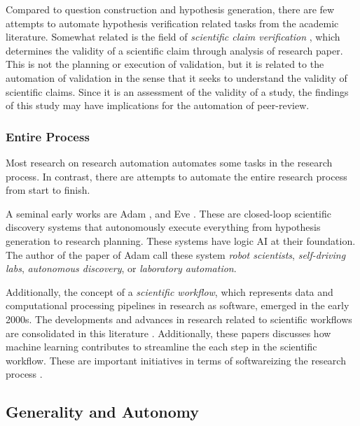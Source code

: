 Compared to question construction and hypothesis generation, there are few attempts to automate hypothesis verification related tasks from the academic literature. Somewhat related is the field of \textit{scientific claim verification} \cite{li2019scientific,wadden2020fact,wadden2022scifact,wadden2022multivers,wang2023using}, which determines the validity of a scientific claim through analysis of research paper. This is not the planning or execution of validation, but it is related to the automation of validation in the sense that it seeks to understand the validity of scientific claims. Since it is an assessment of the validity of a study, the findings of this study may have implications for the automation of peer-review.

\cite{boiko2023emergent}
\cite{bran2023chemcrow}

\subsubsection{Entire Process}
Most research on research automation automates some tasks in the research process. In contrast, there are attempts to automate the entire research process from start to finish.

A seminal early works are Adam \cite{king2004functional}, and Eve \cite{williams2015cheaper}. These are closed-loop scientific discovery systems that autonomously execute everything from hypothesis generation to research planning. These systems have logic AI at their foundation. The author of the paper of Adam call these system \textit{robot scientists}, \textit{self-driving labs}, \textit{autonomous discovery}, or \textit{laboratory automation}.

Additionally, the concept of a \textit{scientific workflow}, which represents data and computational processing pipelines in research as software, emerged in the early 2000s. The developments and advances in research related to scientific workflows are consolidated in this literature \cite{barker2008scientific,atkinson2017scientific}. Additionally, these papers \cite{deelman2019role,nouri2021exploring} discusses how machine learning contributes to streamline the each step in the scientific workflow. These are important initiatives in terms of softwareizing the research process \cite{deelman2015pegasus,gil2011semantic}.

\subsection{Generality and Autonomy}

